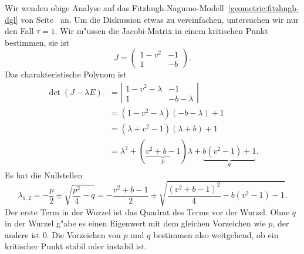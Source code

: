 \begin{beispiel}
\label{geometrie:fh-fortsetzung}
Wir wenden obige Analyse auf das
Fitzhugh-Nagumo-Modell~\eqref{geometrie:fitzhugh-dgl} von
Seite~\pageref{geometrie:fitzhugh-dgl} an.
%
Um die Diskussion etwas zu vereinfachen, untersuchen wir nur den Fall
$\tau = 1$.
Wir m"ussen die Jacobi-Matrix in einem kritischen Punkt bestimmen, sie ist
%
\begin{equation}
J=
\begin{pmatrix}
1-v^2 &  -1 \\
  1   &  -b
\end{pmatrix}.
\end{equation}
Das charakteristische Polynom ist
\begin{align*}
\det(J-\lambda E)
&=
\left|
\begin{matrix}
1-v^2-\lambda&-1\\
1&-b-\lambda
\end{matrix}
\right|
\\
&=
(1-v^2-\lambda)(-b-\lambda)+1
\\
&=
(\lambda+v^2-1)(\lambda+b)+1
\\
&=
\lambda^2 + (\underbrace{v^2 + b - 1}_{\displaystyle p})\lambda
+ \underbrace{b(v^2 - 1)+1}_{\displaystyle q}.
\end{align*}
Es hat die Nullstellen
\begin{equation}
\lambda_{1,2}
=
-\frac{p}{2}\pm\sqrt{\frac{p^2}4-q}
=
-\frac{v^2+b-1}2\pm\sqrt{\frac{(v^2+b-1)^2}4-b(v^2-1)-1}.
\label{geometrie:fn-eigenwerte}
\end{equation}
Der erste Term in der Wurzel ist das Quadrat des Terms vor der Wurzel.
Ohne $q$ in der Wurzel g"abe es einen Eigenwert mit dem gleichen Vorzeichen
wie $p$, der andere ist $0$.
Die Vorzeichen von $p$ und $q$ bestimmen also weitgehend, ob ein 
kritischer Punkt stabil oder instabil ist.


\end{beispiel}

